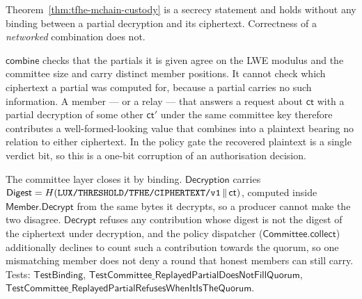 \begin{remark}
\label{rem:tfhe-ciphertext-binding}
Theorem~\ref{thm:tfhe-mchain-custody} is a secrecy statement and holds without
any binding between a partial decryption and its ciphertext. Correctness of a
\emph{networked} combination does not.

$\mathsf{combine}$ checks that the partials it is given agree on the LWE
modulus and the committee size and carry distinct member positions. It cannot
check which ciphertext a partial was computed for, because a partial carries no
such information. A member --- or a relay --- that answers a request about
$\mathsf{ct}$ with a partial decryption of some other $\mathsf{ct}'$ under the
same committee key therefore contributes a well-formed-looking value that
combines into a plaintext bearing no relation to either ciphertext. In the
policy gate the recovered plaintext is a single verdict bit, so this is a
one-bit corruption of an authorisation decision.

The committee layer closes it by binding. $\mathsf{Decryption}$ carries
$\mathsf{Digest} = H(\text{\texttt{LUX/THRESHOLD/TFHE/CIPHERTEXT/v1}} \,\|\,
\mathsf{ct})$, computed inside $\mathsf{Member.Decrypt}$ from the same bytes it
decrypts, so a producer cannot make the two disagree. $\mathsf{Decrypt}$
refuses any contribution whose digest is not the digest of the ciphertext under
decryption, and the policy dispatcher ($\mathsf{Committee.collect}$)
additionally declines to count such a contribution towards the quorum, so one
mismatching member does not deny a round that honest members can still carry.
Tests: $\mathsf{TestBinding}$,
$\mathsf{TestCommittee\_ReplayedPartialDoesNotFillQuorum}$,
$\mathsf{TestCommittee\_ReplayedPartialRefusesWhenItIsTheQuorum}$.
\end{remark}

